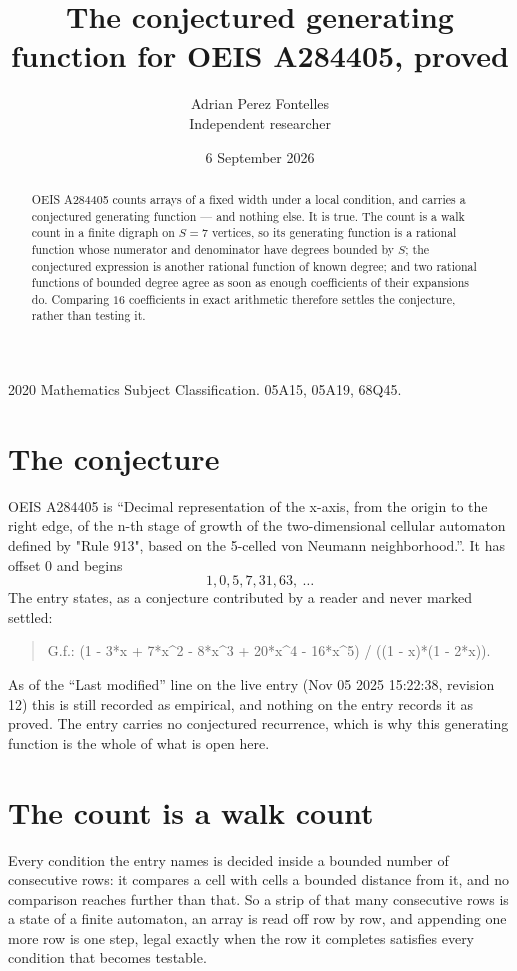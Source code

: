 \documentclass[11pt,a4paper]{article}
\title{The conjectured generating function for OEIS A284405, proved}
\author{Adrian Perez Fontelles\\ \small Independent researcher}
\date{6 September 2026}
\theoremstyle{plain}
\theoremstyle{definition}
\begin{document}
\maketitle

\begin{abstract}
OEIS A284405 counts arrays of a fixed width under a local condition, and carries a conjectured
generating function --- and nothing else. It is true. The count is a walk count in a finite
digraph on $S=7$ vertices, so its generating function is a rational function whose numerator
and denominator have degrees bounded by $S$; the conjectured expression is another rational
function of known degree; and two rational functions of bounded degree agree as soon as enough
coefficients of their expansions do. Comparing $16$ coefficients in exact arithmetic
therefore settles the conjecture, rather than testing it.
\end{abstract}

\noindent\small 2020 Mathematics Subject Classification. 05A15, 05A19, 68Q45.\normalsize

\section{The conjecture}

OEIS A284405 is ``Decimal representation of the x-axis, from the origin to the right edge, of the n-th stage of growth of the two-dimensional cellular automaton defined by "Rule 913", based on the 5-celled von Neumann neighborhood.''. It has offset $0$ and begins
\[
1, 0, 5, 7, 31, 63,\ \dots
\]
The entry states, as a conjecture contributed by a reader and never marked settled:
\begin{quote}
G.f.: (1 - 3*x + 7*x\^{}2 - 8*x\^{}3 + 20*x\^{}4 - 16*x\^{}5) / ((1 - x)*(1 - 2*x)).
\end{quote}
As of the ``Last modified'' line on the live entry (Nov 05 2025 15:22:38, revision 12) this is still
recorded as empirical, and nothing on the entry records it as proved. The entry carries no
conjectured recurrence, which is why this generating function is the whole of what is open
here.

\section{The count is a walk count}

Every condition the entry names is decided inside a bounded number of consecutive rows: it
compares a cell with cells a bounded distance from it, and no comparison reaches further than
that. So a strip of that many consecutive rows is a state of a finite automaton, an array is
read off row by row, and appending one more row is one step, legal exactly when the row it
completes satisfies every condition that becomes testable.
\end{document}
